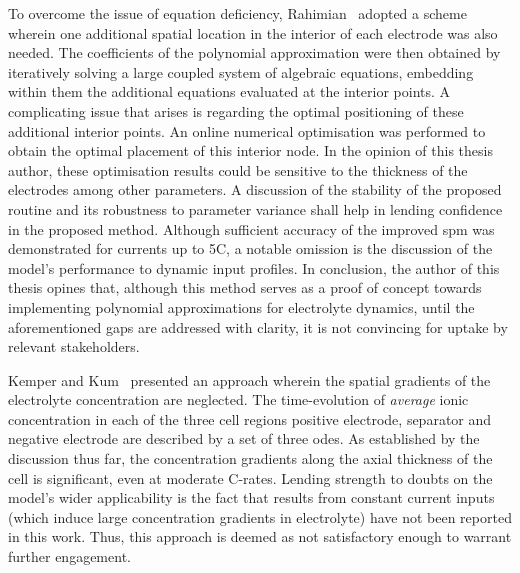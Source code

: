To overcome the issue of  equation deficiency, Rahimian~\etal{} adopted a scheme
wherein one  additional spatial location in  the interior of each  electrode was
also needed. The coefficients of the polynomial approximation were then obtained
by iteratively solving a large  coupled system of algebraic equations, embedding
within  them  the additional  equations  evaluated  at  the interior  points.  A
complicating issue  that arises  is regarding the  optimal positioning  of these
additional interior  points. An online  numerical optimisation was  performed to
obtain  the optimal  placement of  this interior  node. In  the opinion  of this
thesis author, these optimisation results could be sensitive to the thickness of
the electrodes  among other  parameters. A  discussion of  the stability  of the
proposed routine and its robustness to  parameter variance shall help in lending
confidence in the proposed method.  Although sufficient accuracy of the improved
\gls{spm} was  demonstrated for  currents up  to 5C, a  notable omission  is the
discussion of the model's performance  to dynamic input profiles. In conclusion,
the author of this thesis opines that, although this method serves as a proof of
concept towards implementing polynomial approximations for electrolyte dynamics,
until the aforementioned  gaps are addressed with clarity, it  is not convincing
for uptake by relevant stakeholders.

Kemper  and  Kum~\cite{Kemper2013} presented  an  approach  wherein the  spatial
gradients of the electrolyte concentration  are neglected. The time-evolution of
\emph{average}  ionic concentration  in each  of the  three cell  regions \viz{}
positive electrode, separator  and negative electrode are described by  a set of
three \glspl{ode}. As established by  the discussion thus far, the concentration
gradients along the axial thickness of the cell is significant, even at moderate
{C-rates}. Lending strength to doubts on  the model's wider applicability is the
fact that results from constant current inputs (which induce large concentration
gradients  in electrolyte)  have  not been  reported in  this  work. Thus,  this
approach is deemed as not satisfactory enough to warrant further engagement.

